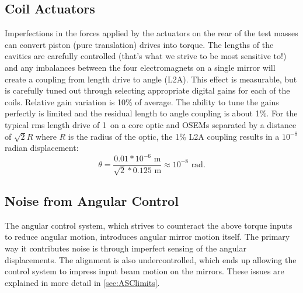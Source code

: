 



\subsection{Coil Actuators} 
\label{sec:L2A}
Imperfections in the forces applied by the actuators on the rear of the test masses can convert piston (pure translation) drives into torque. The lengths of the cavities are carefully controlled (that's what we strive to be most sensitive to!) and any imbalances between the four electromagnets on a single mirror will create a coupling from length drive to angle (L2A). This effect is measurable, but is carefully tuned out through selecting appropriate digital gains for each of the coils. Relative gain variation is 10\% of average. The ability to tune the gains perfectly is limited and the residual length to angle coupling is about 1\%. For the typical rms length drive of 1~\micronspace on a core optic and OSEMs separated by a distance of $\sqrt{2} R$ where $R$ is the radius of the optic, the 1\% L2A coupling results in a $10^{-8}$ radian displacement: 
\begin{equation} 
\theta = \frac{0.01 * 10^{-6} \mbox{ m}}{\sqrt{2} * 0.125 \mbox{ m}} \approx 10^{-8} \mbox{ rad}.  
\end{equation}



\subsection{Noise from Angular Control}
The angular control system, which strives to counteract the above torque inputs to reduce angular motion, introduces angular mirror motion itself. The primary way it contributes noise is through imperfect sensing of the angular displacements. The alignment is also undercontrolled, which ends up allowing the control system to impress input beam motion on the mirrors. These issues are explained in more detail in \ref{sec:ASClimits}.


